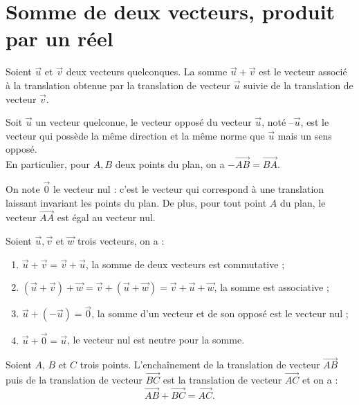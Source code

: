 \documentclass[a4paper, 12pt]{report}
\begin{document}
\section{Somme de deux vecteurs, produit par un réel}

\begin{defn}
Soient $\vec{u}$ et $\vec{v}$ deux vecteurs quelconques. La somme $\vec{u} + \vec{v}$ est le vecteur associé à la translation obtenue
par la translation de vecteur $\vec{u}$ suivie de la translation de vecteur $\vec{v}$.
\end{defn}

\begin{defn}
Soit $\vec{u}$ un vecteur quelconue, le vecteur opposé du vecteur $\vec{u}$, noté $–\vec{u}$, est le vecteur qui possède la même
direction et la même norme que $\vec{u}$ mais un sens opposé. \\
En particulier, pour $A, B$ deux points du plan, on a $-\vec{AB} = \vec{BA}$.
\end{defn}

\begin{defn}
On note $\vec{0}$ le vecteur nul : c'est le vecteur qui correspond à une translation laissant invariant les points du plan.
De plus, pour tout point $A$ du plan, le vecteur $\vec{AA}$ est égal au vecteur nul.
\end{defn}

\begin{prop}
Soient $\vec{u}, \vec{v}$ et $\vec{w}$ trois vecteurs, on a :
\begin{enumerate}
\item $\vec{u} + \vec{v} = \vec{v} + \vec{u}$, la somme de deux vecteurs est commutative ;
\item $(\vec{u} + \vec{v}) + \vec{w} = \vec{v} + (\vec{u} + \vec{w}) =  \vec{v} + \vec{u} + \vec{w}$, la somme est associative ;
\item $\vec{u} + (-\vec{u}) = \vec{0}$, la somme d'un vecteur et de son opposé est le vecteur nul ;
\item $\vec{u} + \vec{0} = \vec{u}$, le vecteur nul est neutre pour la somme.
\end{enumerate}
\end{prop}

\begin{thm}
Soient $A$, $B$ et $C$ trois points. L’enchaînement de la translation de vecteur $\vec{AB}$ puis de la translation de vecteur $\vec{BC}$
est la translation de vecteur $\vec{AC}$ et on a : 
\[ \vec{AB} + \vec{BC} = \vec{AC} . \]
\end{thm}
\end{document}

